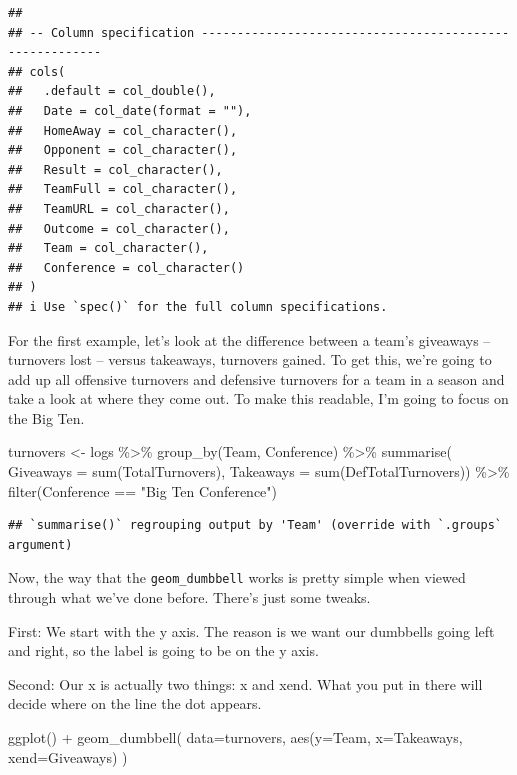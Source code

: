 \documentclass[
]{book}
\newenvironment{Shaded}{\begin{snugshade}}{\end{snugshade}}
\newcommand{\AttributeTok}[1]{\textcolor[rgb]{0.77,0.63,0.00}{#1}}
\newcommand{\FunctionTok}[1]{\textcolor[rgb]{0.00,0.00,0.00}{#1}}
\newcommand{\NormalTok}[1]{#1}
\newcommand{\OtherTok}[1]{\textcolor[rgb]{0.56,0.35,0.01}{#1}}
\newcommand{\SpecialCharTok}[1]{\textcolor[rgb]{0.00,0.00,0.00}{#1}}
\newcommand{\StringTok}[1]{\textcolor[rgb]{0.31,0.60,0.02}{#1}}
\begin{document}
\begin{verbatim}
## 
## -- Column specification --------------------------------------------------------
## cols(
##   .default = col_double(),
##   Date = col_date(format = ""),
##   HomeAway = col_character(),
##   Opponent = col_character(),
##   Result = col_character(),
##   TeamFull = col_character(),
##   TeamURL = col_character(),
##   Outcome = col_character(),
##   Team = col_character(),
##   Conference = col_character()
## )
## i Use `spec()` for the full column specifications.
\end{verbatim}

For the first example, let's look at the difference between a team's giveaways -- turnovers lost -- versus takeaways, turnovers gained. To get this, we're going to add up all offensive turnovers and defensive turnovers for a team in a season and take a look at where they come out. To make this readable, I'm going to focus on the Big Ten.

\begin{Shaded}
\begin{Highlighting}[]
\NormalTok{turnovers }\OtherTok{\textless{}{-}}\NormalTok{ logs }\SpecialCharTok{\%\textgreater{}\%}
  \FunctionTok{group\_by}\NormalTok{(Team, Conference) }\SpecialCharTok{\%\textgreater{}\%} 
  \FunctionTok{summarise}\NormalTok{(}
    \AttributeTok{Giveaways =} \FunctionTok{sum}\NormalTok{(TotalTurnovers), }
    \AttributeTok{Takeaways =} \FunctionTok{sum}\NormalTok{(DefTotalTurnovers)) }\SpecialCharTok{\%\textgreater{}\%}
  \FunctionTok{filter}\NormalTok{(Conference }\SpecialCharTok{==} \StringTok{"Big Ten Conference"}\NormalTok{)}
\end{Highlighting}
\end{Shaded}

\begin{verbatim}
## `summarise()` regrouping output by 'Team' (override with `.groups` argument)
\end{verbatim}

Now, the way that the \texttt{geom\_dumbbell} works is pretty simple when viewed through what we've done before. There's just some tweaks.

First: We start with the y axis. The reason is we want our dumbbells going left and right, so the label is going to be on the y axis.

Second: Our x is actually two things: x and xend. What you put in there will decide where on the line the dot appears.

\begin{Shaded}
\begin{Highlighting}[]
\FunctionTok{ggplot}\NormalTok{() }\SpecialCharTok{+} 
  \FunctionTok{geom\_dumbbell}\NormalTok{(}
    \AttributeTok{data=}\NormalTok{turnovers, }
    \FunctionTok{aes}\NormalTok{(}\AttributeTok{y=}\NormalTok{Team, }\AttributeTok{x=}\NormalTok{Takeaways, }\AttributeTok{xend=}\NormalTok{Giveaways)}
\NormalTok{  )}
\end{Highlighting}
\end{Shaded}
\end{document}
